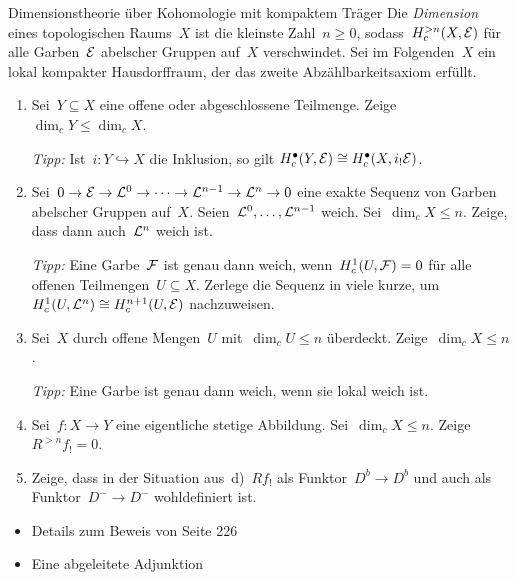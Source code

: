 \documentclass{uebblatt}
\begin{document}
\begin{aufgabe}{Dimensionstheorie über Kohomologie mit kompaktem Träger}
Die \emph{Dimension} eines topologischen Raums~$X$ ist die kleinste Zahl~$n
\geq 0$, sodass~$H_c^{> n}(X,\mathcal{E})$ für alle Garben~$\mathcal{E}$ abelscher Gruppen
auf~$X$ verschwindet. Sei im Folgenden~$X$ ein lokal kompakter Hausdorffraum,
der das zweite Abzählbarkeitsaxiom erfüllt.
\begin{enumerate}
\item Sei~$Y \subseteq X$ eine offene oder abgeschlossene Teilmenge.
Zeige~$\dim_c Y \leq \dim_c X$.

{\tiny\emph{Tipp:} Ist~$i : Y \hookrightarrow X$ die Inklusion, so gilt
$H_c^\bullet(Y,\mathcal{E}) \cong H_c^\bullet(X,i_! \mathcal{E})$.\par}
\item Sei~$0 \to \mathcal{E} \to \mathcal{L}^0 \to \cdots \to \mathcal{L}^{n-1} \to \mathcal{L}^n \to 0$ eine
exakte Sequenz von Garben abelscher Gruppen auf~$X$.
Seien~$\mathcal{L}^0,\ldots,\mathcal{L}^{n-1}$ weich. Sei~$\dim_c X \leq n$. Zeige, dass dann
auch~$\mathcal{L}^n$ weich ist.

{\tiny\emph{Tipp:} Eine Garbe~$\mathcal{F}$ ist genau dann weich, wenn~$H^1_c(U,\mathcal{F}) = 0$
für alle offenen Teilmengen~$U \subseteq X$. Zerlege die Sequenz in viele
kurze, um~$H^1_c(U,\mathcal{L}^n) \cong H^{n+1}_c(U,\mathcal{E})$ nachzuweisen.\par}
\item Sei~$X$ durch offene Mengen~$U$ mit~$\dim_c U \leq
n$ überdeckt. Zeige~$\dim_c X \leq n$.

{\tiny\emph{Tipp:} Eine Garbe ist genau dann weich, wenn sie lokal weich
ist.\par}
\item Sei~$f : X \to Y$ eine eigentliche stetige Abbildung. Sei~$\dim_c X \leq n$.
Zeige~$R^{> n} f_! = 0$.
\item Zeige, dass in der Situation aus~d)~$Rf_!$ als Funktor~$D^b \to D^b$ und
auch als Funktor~$D^- \to D^-$ wohldefiniert ist.
\end{enumerate}
\end{aufgabe}

\begin{itemize}
\item Details zum Beweis von Seite 226
\item Eine abgeleitete Adjunktion
\end{itemize}
\end{document}
